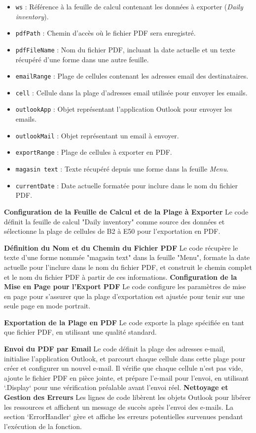 \documentclass[a4paper, oneside, 12pt, final]{extreport}
\begin{document}
\begin{itemize}
    \item \texttt{ws} : Référence à la feuille de calcul contenant les données à exporter (\textit{Daily inventory}).
    \item \texttt{pdfPath} : Chemin d'accès où le fichier PDF sera enregistré.
    \item \texttt{pdfFileName} : Nom du fichier PDF, incluant la date actuelle et un texte récupéré d'une forme dans une autre feuille.
    \item \texttt{emailRange} : Plage de cellules contenant les adresses email des destinataires.
    \item \texttt{cell} : Cellule dans la plage d'adresses email utilisée pour envoyer les emails.
    \item \texttt{outlookApp} : Objet représentant l'application Outlook pour envoyer les emails.
    \item \texttt{outlookMail} : Objet représentant un email à envoyer.
    \item \texttt{exportRange} : Plage de cellules à exporter en PDF.
    \item \texttt{magasin text} : Texte récupéré depuis une forme dans la feuille \textit{Menu}.
    \item \texttt{currentDate} : Date actuelle formatée pour inclure dans le nom du fichier PDF.
\end{itemize}

\textbf{Configuration de la Feuille de Calcul et de la Plage à Exporter}
Le code définit la feuille de calcul "Daily inventory" comme source des données et sélectionne la plage de cellules de B2 à E50 pour l'exportation en PDF.

\textbf{Définition du Nom et du Chemin du Fichier PDF}
Le code récupère le texte d'une forme nommée "magasin text" dans la feuille "Menu", formate la date actuelle pour l'inclure dans le nom du fichier PDF, et construit le chemin complet et le nom du fichier PDF à partir de ces informations.
\textbf{Configuration de la Mise en Page pour l'Export PDF}
Le code configure les paramètres de mise en page pour s'assurer que la plage d'exportation est ajustée pour tenir sur une seule page en mode portrait.

\textbf{Exportation de la Plage en PDF}
Le code exporte la plage spécifiée en tant que fichier PDF, en utilisant une qualité standard.

\textbf{Envoi du PDF par Email}
Le code définit la plage des adresses e-mail, initialise l'application Outlook, et parcourt chaque cellule dans cette plage pour créer et configurer un nouvel e-mail. Il vérifie que chaque cellule n'est pas vide, ajoute le fichier PDF en pièce jointe, et prépare l'e-mail pour l'envoi, en utilisant `.Display` pour une vérification préalable avant l'envoi réel.
\textbf{Nettoyage et Gestion des Erreurs}
Les lignes de code libèrent les objets Outlook pour libérer les ressources et affichent un message de succès après l'envoi des e-mails. La section `ErrorHandler` gère et affiche les erreurs potentielles survenues pendant l'exécution de la fonction.
\end{document}
